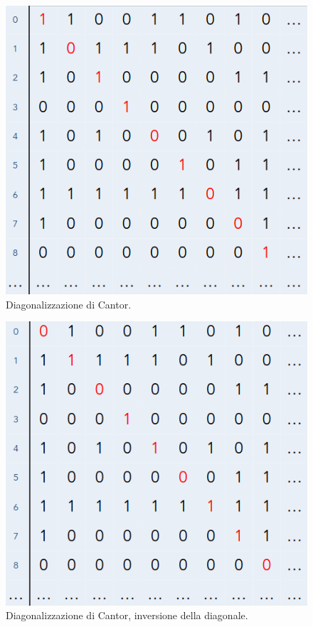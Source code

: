 \begin{figure}[h]
    \centering
    \includegraphics[scale = 0.38]{images/Diagonalizzazione.png}
    \caption{Diagonalizzazione di Cantor.}
\end{figure}

\begin{figure}[h]
    \centering
    \includegraphics[scale = 0.38]{images/Diagonalizzazione 2.png}
    \caption{Diagonalizzazione di Cantor, inversione della diagonale.}
\end{figure}

